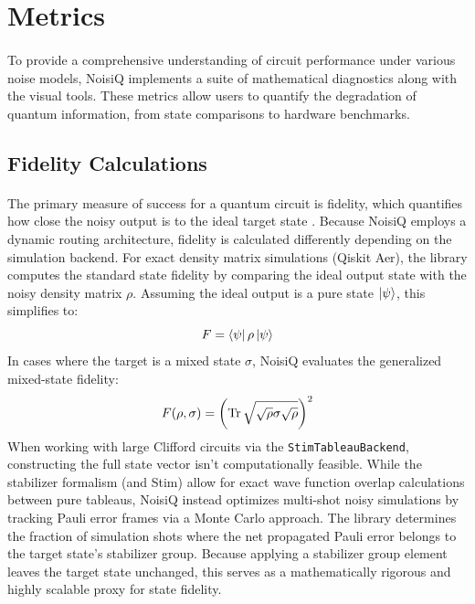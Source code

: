 \documentclass[10pt,twocolumn]{article}
\begin{document}
\section{Metrics}
\label{sec:metrics}
\paragraph{}
    To provide a comprehensive understanding of circuit performance under various noise models, NoisiQ implements a suite of mathematical diagnostics along with the visual tools. 
These metrics allow users to quantify the degradation of quantum information, from state comparisons to hardware benchmarks.

\subsection{Fidelity Calculations}
\label{subsec:fidelity}
\paragraph{}
    The primary measure of success for a quantum circuit is fidelity, which quantifies how close the noisy output is to the ideal target state \cite{nielsenchuang2000}. 
Because NoisiQ employs a dynamic routing architecture, fidelity is calculated differently depending on the simulation backend. 
For exact density matrix simulations (Qiskit Aer), the library computes the standard state fidelity by comparing the ideal output state with the noisy density matrix $\rho$. 
Assuming the ideal output is a pure state $\ket{\psi}$, this simplifies to:
\begin{equation}
    F = \bra{\psi} \rho \ket{\psi}
\end{equation}
    In cases where the target is a mixed state $\sigma$, NoisiQ evaluates the generalized mixed-state fidelity:
\begin{equation}
    F(\rho, \sigma) = \left( \Tr \sqrt{\sqrt{\rho} \sigma \sqrt{\rho}} \right)^2
\end{equation}
    When working with large Clifford circuits via the \texttt{StimTableauBackend}, constructing the full state vector isn't computationally feasible. 
While the stabilizer formalism (and Stim) allow for exact wave function overlap calculations between pure tableaus, 
NoisiQ instead optimizes multi-shot noisy simulations by tracking Pauli error frames via a Monte Carlo approach. 
The library determines the fraction of simulation shots where the net propagated Pauli error belongs to the target state's stabilizer group. 
Because applying a stabilizer group element leaves the target state unchanged, 
this serves as a mathematically rigorous and highly scalable proxy for state fidelity. 
\end{document}
